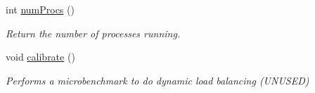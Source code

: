 \begin{DoxyCompactItemize}
int \hyperlink{classfaster_1_1fastContext_a287bc160898c677df176de122d9dfad9}{num\+Procs} ()
\begin{DoxyCompactList}\small\item\em Return the number of processes running. \end{DoxyCompactList}\item 
\hypertarget{classfaster_1_1fastContext_a3dd0172c18a37d863adf28b794020e5c}{}\label{classfaster_1_1fastContext_a3dd0172c18a37d863adf28b794020e5c} 
void \hyperlink{classfaster_1_1fastContext_a3dd0172c18a37d863adf28b794020e5c}{calibrate} ()
\begin{DoxyCompactList}\small\item\em Performs a microbenchmark to do dynamic load balancing (U\+N\+U\+S\+ED) \end{DoxyCompactList}\end{DoxyCompactItemize}
